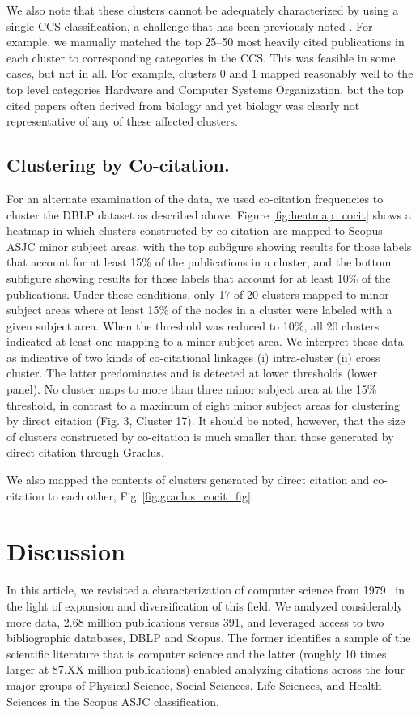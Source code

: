 We also note that these clusters cannot be adequately characterized by using a single CCS classification, a challenge that has been previously noted \cite{waltman_new_2012}.
For example, we
manually matched the top 25--50 most heavily cited publications in each cluster to corresponding categories in the CCS. This was feasible in some cases, but not in all. For example, clusters 0 and 1 mapped reasonably well to the top level categories Hardware and Computer Systems Organization,  but 
the top cited papers often derived from biology and yet biology was clearly not  representative of any of these affected clusters.


\subsection{Clustering by Co-citation.} 
For an alternate examination of the data, we used co-citation frequencies to cluster the DBLP dataset as described above. Figure \ref{fig:heatmap_cocit} shows a heatmap in which clusters constructed by co-citation are mapped to Scopus ASJC minor subject areas, with the top subfigure showing results for those labels that
account for at least 15\% of the publications in a cluster, and the bottom subfigure showing results for those labels that account for at least 10\% of the publications.
Under these conditions, only 17 of 20 clusters mapped to minor subject areas where at least 15\% of the nodes in a cluster were labeled with a given subject area. When the threshold was reduced to 10\%, all 20 clusters indicated at least one mapping to a minor subject area. We interpret these data as indicative of two kinds of co-citational linkages (i) intra-cluster (ii) cross cluster. The latter predominates and is detected at lower thresholds (lower panel). No cluster maps to more than three minor subject area at the 15\% threshold,  in contrast to a maximum of eight minor subject areas for clustering by direct citation (Fig. 3, Cluster 17). It should be noted, however, that the size of clusters constructed by co-citation is much smaller than those generated by direct citation through Graclus. 

We also mapped the contents of clusters generated by direct citation and co-citation to each other, Fig~\ref{fig:graclus_cocit_fig}.

\section{Discussion} In this article, we revisited a characterization of computer science from 1979~\cite{salton_citation_1979} in the light of expansion and diversification of this field. We analyzed considerably more data, 2.68 million publications versus 391, and leveraged access to two bibliographic databases, DBLP and Scopus. The former identifies a sample of the scientific literature that is computer science and the latter (roughly 10 times larger at 87.XX million publications) enabled analyzing citations across the four major groups of Physical Science, Social Sciences, Life Sciences, and Health Sciences in the Scopus ASJC classification.

